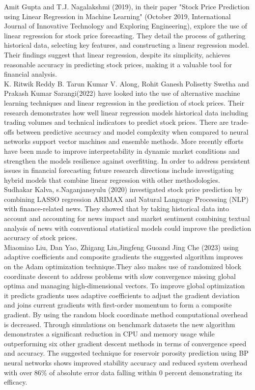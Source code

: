 \documentclass{ieeeojies}
\begin{document}
Amit Gupta and T.J. Nagalakshmi (2019)\cite{b6}, in their paper "Stock Price Prediction using Linear Regression in Machine Learning" (October 2019, International Journal of Innovative Technology and Exploring Engineering), explore the use of linear regression for stock price forecasting. They detail the process of gathering historical data, selecting key features, and constructing a linear regression model. Their findings suggest that linear regression, despite its simplicity, achieves reasonable accuracy in predicting stock prices, making it a valuable tool for financial analysis.\\

K. Ritwik Reddy B. Tarun Kumar V. Along, Rohit Ganesh Polisetty Swetha and Prakash Kumar Sarangi(2022)\cite{b7} have looked into the use of alternative machine learning techniques and linear regression in the prediction of stock prices. Their research demonstrates how well linear regression models historical data including trading volumes and technical indicators to predict stock prices. There are trade-offs between predictive accuracy and model complexity when compared to neural networks support vector machines and ensemble methods. More recently efforts have been made to improve interpretability in dynamic market conditions and strengthen the models resilience against overfitting. In order to address persistent issues in financial forecasting future research directions include investigating hybrid models that combine linear regression with other methodologies.
\\
Sudhakar Kalva, s.Naganjaneyulu (2020)\cite{b8} investigated stock price prediction by combining LASSO regression ARIMAX and Natural Language Processing (NLP) with finance-related news. They showed that by taking historical data into account and accounting for news impact and market sentiment combining textual analysis of news with conventional statistical models could improve the prediction accuracy of stock prices.\\

Miaomiao Liu, Dan Yao, Zhigang Liu,Jingfeng Guoand Jing Che (2023)\cite{b9}  using adaptive coefficients and composite gradients the suggested algorithm improves on the Adam optimization technique.They also makes use of randomized block coordinate descent to address problems with slow convergence missing global optima and managing high-dimensional vectors. To improve global optimization it predicts gradients uses adaptive coefficients to adjust the gradient deviation and joins current gradients with first-order momentum to form a composite gradient. By using the random block coordinate method computational overhead is decreased. Through simulations on benchmark datasets the new algorithm demonstrates a significant reduction in CPU and memory usage while outperforming six other gradient descent methods in terms of convergence speed and accuracy. The suggested technique for reservoir porosity prediction using BP neural networks shows improved stability accuracy and reduced system overhead with over 86\% of absolute error data falling within 0 percent demonstrating its efficacy.\\
\end{document}
